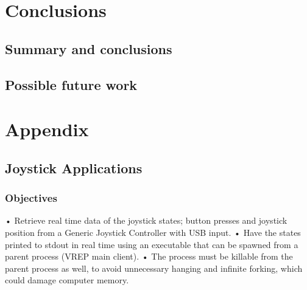 \documentclass[12pt,openany,a4paper]{book}
\begin{document}
\chapter{Conclusions}

\section{Summary and conclusions}

\section{Possible future work}

\appendix


\newpage
{}
\mbox{}
\newpage



\chapter{Appendix}
\section{Joystick Applications}
\subsection{Objectives}
•	Retrieve real time data of the joystick states; button presses and joystick position from a Generic Joystick Controller with USB input.
•	Have the states printed to stdout in real time using an executable that can be spawned from a parent process (VREP main client).
•	The process must be killable from the parent process as well, to avoid unnecessary hanging and infinite forking, which could damage computer memory.
\end{document}
